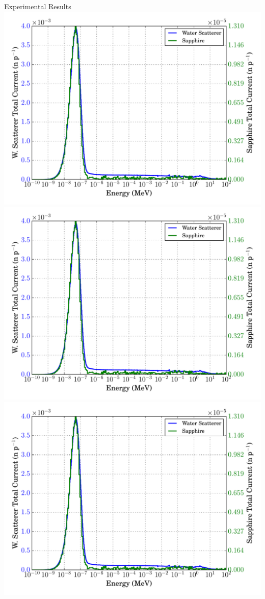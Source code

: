 \documentclass[final,t]{beamer}
\begin{document}
\begin{frame}{}
\begin{columns}[t]
\begin{column}{.3\linewidth}
      \begin{block}{Experimental Results}
        \centering
        \includegraphics[width=0.33\linewidth]{specs.pdf}%
        \includegraphics[width=0.33\linewidth]{specs.pdf}%
        \includegraphics[width=0.33\linewidth]{specs.pdf}%

        \begin{table}
        \end{table}
      \end{block}
      

\end{column}
\end{columns}
\end{frame}
\end{document}
